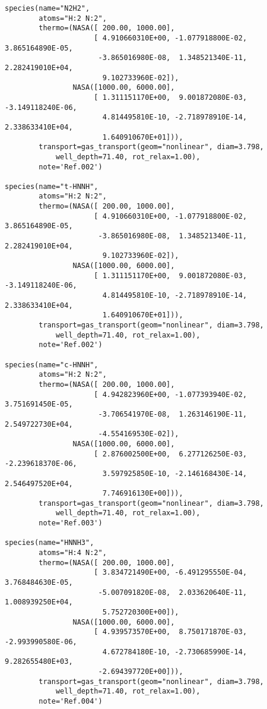 \begin{verbatim}
species(name="N2H2",
        atoms="H:2 N:2",
        thermo=(NASA([ 200.00, 1000.00],
                     [ 4.910660310E+00, -1.077918800E-02, 3.865164890E-05,
                      -3.865016980E-08,  1.348521340E-11, 2.282419010E+04,
                       9.102733960E-02]),
                NASA([1000.00, 6000.00],
                     [ 1.311151170E+00,  9.001872080E-03, -3.149118240E-06,
                       4.814495810E-10, -2.718978910E-14,  2.338633410E+04,
                       1.640910670E+01])),
        transport=gas_transport(geom="nonlinear", diam=3.798,
            well_depth=71.40, rot_relax=1.00),
        note='Ref.002')

species(name="t-HNNH",
        atoms="H:2 N:2",
        thermo=(NASA([ 200.00, 1000.00],
                     [ 4.910660310E+00, -1.077918800E-02, 3.865164890E-05,
                      -3.865016980E-08,  1.348521340E-11, 2.282419010E+04,
                       9.102733960E-02]),
                NASA([1000.00, 6000.00],
                     [ 1.311151170E+00,  9.001872080E-03, -3.149118240E-06,
                       4.814495810E-10, -2.718978910E-14,  2.338633410E+04,
                       1.640910670E+01])),
        transport=gas_transport(geom="nonlinear", diam=3.798,
            well_depth=71.40, rot_relax=1.00),
        note='Ref.002')

species(name="c-HNNH",
        atoms="H:2 N:2",
        thermo=(NASA([ 200.00, 1000.00],
                     [ 4.942823960E+00, -1.077393940E-02,  3.751691450E-05,
                      -3.706541970E-08,  1.263146190E-11,  2.549722730E+04,
                      -4.554169530E-02]),
                NASA([1000.00, 6000.00],
                     [ 2.876002500E+00,  6.277126250E-03, -2.239618370E-06,
                       3.597925850E-10, -2.146168430E-14,  2.546497520E+04,
                       7.746916130E+00])),
        transport=gas_transport(geom="nonlinear", diam=3.798,
            well_depth=71.40, rot_relax=1.00),
        note='Ref.003')

species(name="HNNH3",
        atoms="H:4 N:2",
        thermo=(NASA([ 200.00, 1000.00],
                     [ 3.834721490E+00, -6.491295550E-04,  3.768484630E-05,
                      -5.007091820E-08,  2.033620640E-11,  1.008939250E+04,
                       5.752720300E+00]),
                NASA([1000.00, 6000.00],
                     [ 4.939573570E+00,  8.750171870E-03, -2.993990580E-06,
                       4.672784180E-10, -2.730685990E-14,  9.282655480E+03,
                      -2.694397720E+00])),
        transport=gas_transport(geom="nonlinear", diam=3.798,
            well_depth=71.40, rot_relax=1.00),
        note='Ref.004')


\end{verbatim}
